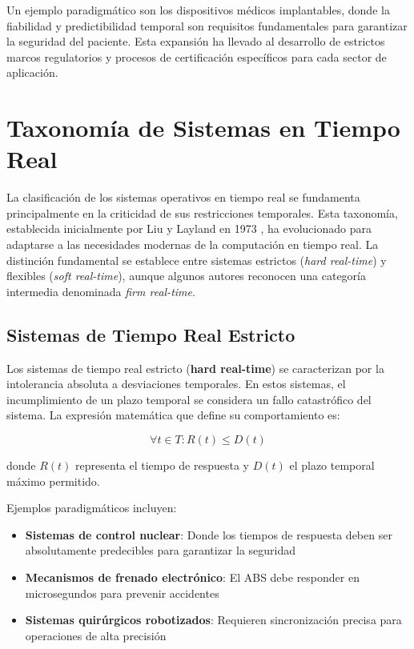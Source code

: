 Un ejemplo paradigmático son los dispositivos médicos implantables, donde la fiabilidad y predictibilidad temporal son requisitos fundamentales para garantizar la seguridad del paciente. Esta expansión ha llevado al desarrollo de estrictos marcos regulatorios y procesos de certificación específicos para cada sector de aplicación.

\newpage
\section{Taxonomía de Sistemas en Tiempo Real}
    La clasificación de los sistemas operativos en tiempo real se fundamenta principalmente en la criticidad de sus restricciones temporales. Esta taxonomía, establecida inicialmente por Liu y Layland en 1973 \cite{Siewert_Pratt_2016}, ha evolucionado para adaptarse a las necesidades modernas de la computación en tiempo real. La distinción fundamental se establece entre sistemas estrictos (\textit{hard real-time}) y flexibles (\textit{soft real-time}), aunque algunos autores reconocen una categoría intermedia denominada \textit{firm real-time}.

    \subsection{Sistemas de Tiempo Real Estricto}
        Los sistemas de tiempo real estricto (\textbf{hard real-time}) se caracterizan por la intolerancia absoluta a desviaciones temporales. En estos sistemas, el incumplimiento de un plazo temporal se considera un fallo catastrófico del sistema. La expresión matemática que define su comportamiento es:

        \begin{equation}
        \forall t \in T: R(t) \leq D(t)
        \end{equation}

        donde $R(t)$ representa el tiempo de respuesta y $D(t)$ el plazo temporal máximo permitido.

        Ejemplos paradigmáticos incluyen:
        \begin{itemize}
            \item \textbf{Sistemas de control nuclear}: Donde los tiempos de respuesta deben ser absolutamente predecibles para garantizar la seguridad
            \item \textbf{Mecanismos de frenado electrónico}: El ABS debe responder en microsegundos para prevenir accidentes
            \item \textbf{Sistemas quirúrgicos robotizados}: Requieren sincronización precisa para operaciones de alta precisión
        \end{itemize}


